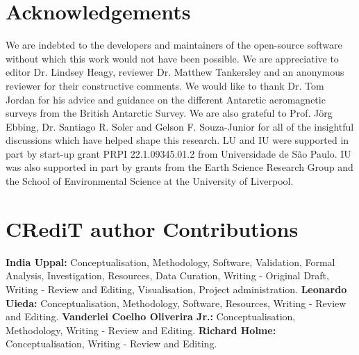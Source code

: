 \section{Acknowledgements}

We are indebted to the developers and maintainers of the open-source software without which this work would not have been possible. We are appreciative to editor Dr. Lindsey Heagy, reviewer Dr. Matthew Tankersley and an anonymous reviewer for their constructive comments. We would like to thank Dr. Tom Jordan for his advice and guidance on the different Antarctic aeromagnetic surveys from the British Antarctic Survey. We are also grateful to Prof. J\"{o}rg Ebbing, Dr. Santiago R. Soler and Gelson F. Souza-Junior for all of the insightful discussions which have helped shape this research. LU and IU were supported in part by start-up grant PRPI 22.1.09345.01.2 from Universidade de São Paulo. IU was also supported in part by grants from the Earth Science Research Group and the School of Environmental Science at the University of Liverpool.

\section{CRediT author Contributions}

\textbf{India Uppal:} Conceptualisation, Methodology, Software, Validation, Formal Analysis, Investigation, Resources, Data Curation, Writing - Original Draft, Writing - Review and Editing, Visualisation, Project administration.
\textbf{Leonardo Uieda:} Conceptualisation, Methodology, Software, Resources, Writing - Review and Editing.
\textbf{Vanderlei Coelho Oliverira Jr.:} Conceptualisation, Methodology, Writing - Review and Editing.
\textbf{Richard Holme:} Conceptualisation, Writing - Review and Editing.
